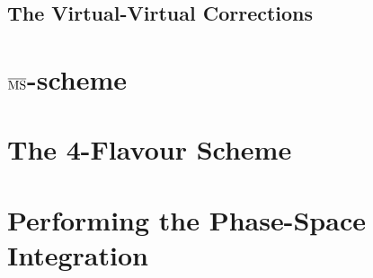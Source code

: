 \subsection{The Virtual-Virtual Corrections}
\section{\texorpdfstring{$\overline{\mathrm{MS}}$}{MS}-scheme}
\section{The 4-Flavour Scheme}\label{sec:5:4FS}
\section{Performing the Phase-Space Integration}


